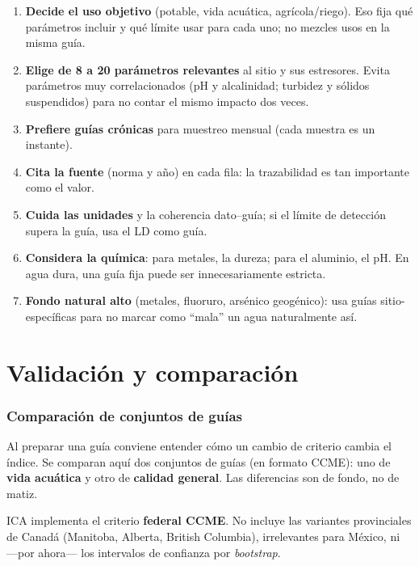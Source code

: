 \documentclass[11pt,a4paper]{article}
\begin{document}
\begin{keybox}
\begin{enumerate}[leftmargin=1.3em,nosep]
  \item \textbf{Decide el uso objetivo} (potable, vida acuática, agrícola/riego). Eso fija qué
  parámetros incluir y qué límite usar para cada uno; no mezcles usos en la misma guía.
  \item \textbf{Elige de 8 a 20 parámetros relevantes} al sitio y sus estresores. Evita parámetros muy
  correlacionados (pH y alcalinidad; turbidez y sólidos suspendidos) para no contar el mismo impacto dos veces.
  \item \textbf{Prefiere guías crónicas} para muestreo mensual (cada muestra es un instante).
  \item \textbf{Cita la fuente} (norma y año) en cada fila: la trazabilidad es tan importante como el valor.
  \item \textbf{Cuida las unidades} y la coherencia dato–guía; si el límite de detección supera la guía, usa el LD como guía.
  \item \textbf{Considera la química}: para metales, la dureza; para el aluminio, el pH. En agua dura, una guía fija puede ser innecesariamente estricta.
  \item \textbf{Fondo natural alto} (metales, fluoruro, arsénico geogénico): usa guías sitio-específicas para no marcar como ``mala'' un agua naturalmente así.
\end{enumerate}
\end{keybox}

\part{Validación y comparación}

\section{Comparación de conjuntos de guías}
Al preparar una guía conviene entender cómo un cambio de criterio cambia el índice. Se comparan aquí
dos conjuntos de guías (en formato CCME): uno de \textbf{vida acuática} y otro de \textbf{calidad
general}. Las diferencias son de fondo, no de matiz.

\begin{keybox}
ICA implementa el criterio \textbf{federal CCME}. No incluye las variantes provinciales de Canadá
(Manitoba, Alberta, British Columbia), irrelevantes para México, ni —por ahora— los intervalos de
confianza por \emph{bootstrap}.
\end{keybox}
\end{document}
